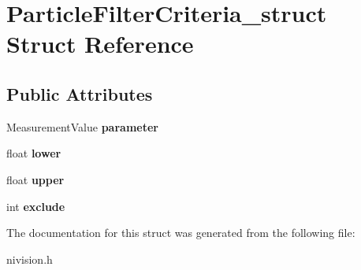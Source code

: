 \hypertarget{structParticleFilterCriteria__struct}{
\section{ParticleFilterCriteria\_\-struct Struct Reference}
\label{structParticleFilterCriteria__struct}
}
\subsection*{Public Attributes}
\begin{DoxyCompactItemize}
\item 
\hypertarget{structParticleFilterCriteria__struct_ab8525522c37ff88e7e06bce0835ea0cd}{
MeasurementValue {\bfseries parameter}}
\label{structParticleFilterCriteria__struct_ab8525522c37ff88e7e06bce0835ea0cd}

\item 
\hypertarget{structParticleFilterCriteria__struct_a6bb0949cb2db3b1dd09719a6fc025744}{
float {\bfseries lower}}
\label{structParticleFilterCriteria__struct_a6bb0949cb2db3b1dd09719a6fc025744}

\item 
\hypertarget{structParticleFilterCriteria__struct_ae5d5a5091f6422e525fd0cc1eed5f3bd}{
float {\bfseries upper}}
\label{structParticleFilterCriteria__struct_ae5d5a5091f6422e525fd0cc1eed5f3bd}

\item 
\hypertarget{structParticleFilterCriteria__struct_a114fda1577f77404f72621abe8f77d84}{
int {\bfseries exclude}}
\label{structParticleFilterCriteria__struct_a114fda1577f77404f72621abe8f77d84}

\end{DoxyCompactItemize}


The documentation for this struct was generated from the following file:\begin{DoxyCompactItemize}
\item 
nivision.h\end{DoxyCompactItemize}
